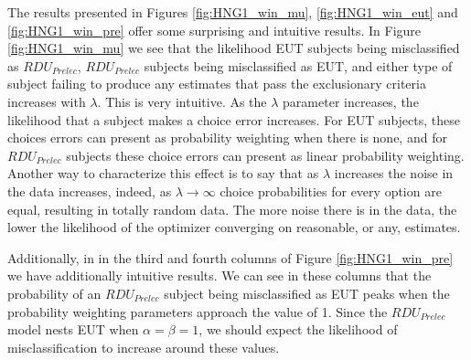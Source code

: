 \documentclass[../main.tex]{subfiles}
\begin{document}
The results presented in Figures \ref{fig:HNG1_win_mu}, \ref{fig:HNG1_win_eut} and \ref{fig:HNG1_win_pre} offer some surprising and intuitive results.
In Figure \ref{fig:HNG1_win_mu} we see that the likelihood EUT subjects being misclassified as $\mathit{RDU_{Prelec}}$, $\mathit{RDU_{Prelec}}$ subjects being misclassified as EUT, and either type of subject failing to produce any estimates that pass the exclusionary criteria increases with $\lambda$.
This is very intuitive. 
As the $\lambda$ parameter increases, the likelihood that a subject makes a choice error increases.
For EUT subjects, these choices errors can present as probability weighting when there is none, and for $\mathit{RDU_{Prelec}}$ subjects these choice errors can present as linear probability weighting.
Another way to characterize this effect is to say that as $\lambda$ increases the noise in the data increases, indeed, as $\lambda \to \infty$ choice probabilities for every option are equal, resulting in totally random data.
The more noise there is in the data, the lower the likelihood of the optimizer converging on reasonable, or any, estimates.

Additionally, in in the third and fourth columns of Figure \ref{fig:HNG1_win_pre} we have additionally intuitive results.
We can see in these columns that the probability of an $\mathit{RDU_{Prelec}}$ subject being misclassified as EUT peaks when the probability weighting parameters approach the value of 1.
Since the $\mathit{RDU_{Prelec}}$ model nests EUT when $\alpha = \beta = 1$, we should expect the likelihood of misclassification to increase around these values.

\end{document}
